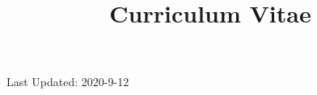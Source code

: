 \documentclass[12pt, letterpaper, sans, unicode]{moderncv}
\title{Curriculum Vitae}
\begin{document}
    \makecvtitle

    

    

    

    
    
    

    
    
    

    
    
    
    
    
    
    
    
    

    

    \vspace{50pt}
    
    Last Updated: 2020-9-12
\end{document}
